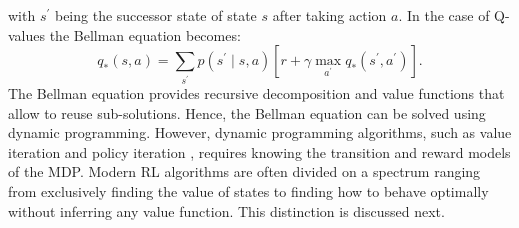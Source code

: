 \documentclass[\home/main.tex]{subfiles}
\begin{document}
with $s^{\prime}$ being the successor state of state $s$ after taking action $a$. In the case of Q-values the Bellman equation becomes:
\begin{equation}
	q_{*}(s, a)=\sum_{s^{\prime}} p\left(s^{\prime} \mid s, a\right)\left[r+\gamma \max _{a^{\prime}} q_{*}\left(s^{\prime}, a^{\prime}\right)\right].
\end{equation}
The Bellman equation provides recursive decomposition and value functions that allow to reuse sub-solutions. Hence, the Bellman equation can be solved using dynamic programming. However, dynamic programming algorithms, such as value iteration and policy iteration \autocite{Sutton2018}, requires knowing the transition and reward models of the MDP. Modern RL algorithms are often divided on a spectrum ranging from exclusively finding the value of states to finding how to behave optimally without inferring any value function. This distinction is discussed next.
\end{document}

